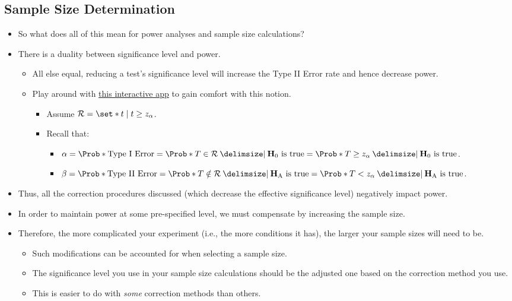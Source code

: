 \subsection{Sample Size Determination}
\begin{itemize}
      \item So what does all of this mean for power analyses and sample size calculations?
      \item There is a duality between significance level and power.
            \begin{itemize}
                  \item All else equal, reducing a test's significance level will increase the Type II Error rate and hence
                        decrease power.
                  \item Play around with \href{https://nathaniel-t-stevens.shinyapps.io/ErrorIllustrator/}{this interactive app} to gain comfort with this notion.
                        \begin{itemize}
                              \item Assume $ \mathcal{R}=\set*{t\mid t\ge z_\alpha} $.
                              \item Recall that: \begin{itemize}
                                          \item $ \alpha=\Prob*{\text{Type I Error}}=\Prob*{T\in\mathcal{R}\given \text{$ \mathbf{H}_0 $ is true}}=\Prob*{T\ge z_\alpha\given \text{$ \mathbf{H}_0 $ is true}}$.
                                          \item $ \beta=\Prob*{\text{Type II Error}}=\Prob*{T\notin\mathcal{R}\given \text{$ \mathbf{H}_\text{A} $ is true}}=\Prob*{T< z_\alpha\given \text{$ \mathbf{H}_\text{A} $ is true}} $.
                                    \end{itemize}
                        \end{itemize}
            \end{itemize}
      \item Thus, all the correction procedures discussed (which decrease the effective significance level)
            negatively impact power.
      \item In order to maintain power at some pre-specified level, we must compensate by increasing the sample
            size.
      \item Therefore, the more complicated your experiment (i.e., the more conditions it has), the larger your
            sample sizes will need to be.
            \begin{itemize}
                  \item Such modifications can be accounted for when selecting a sample size.
                  \item The significance level you use in your sample size calculations should be the adjusted one based
                        on the correction method you use.
                  \item This is easier to do with \emph{some} correction methods than others.
            \end{itemize}
\end{itemize}

